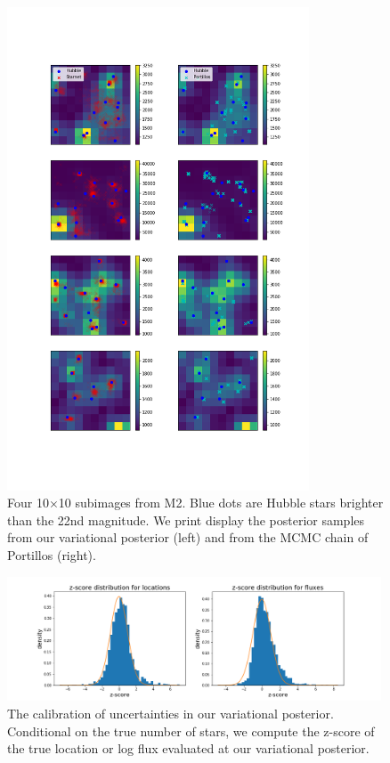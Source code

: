 \begin{figure}[h]
    \centering
    \vspace{-3cm}
    \includegraphics[width=0.8\textwidth]{figures/example_subimages_samples.png}    
    \vspace{-3cm}
    \caption{Four 10$\times$10 subimages from 
    M2. Blue dots are Hubble stars brighter than the 22nd magnitude. 
    We print display the posterior samples from our variational 
    posterior (left) and from the MCMC chain of Portillos (right). }
    \label{fig:example_subimages_sampled}
\end{figure}

\begin{figure}[h]
    \centering
    \includegraphics[width=0.99\textwidth]{figures/z-score_calibration.png}    
    \caption{The calibration of uncertainties in our variational posterior. Conditional on the true number of stars, we compute the z-score of the true location or log flux evaluated at our 
    variational posterior. }
    \label{fig:z-score_calibration}
\end{figure}


